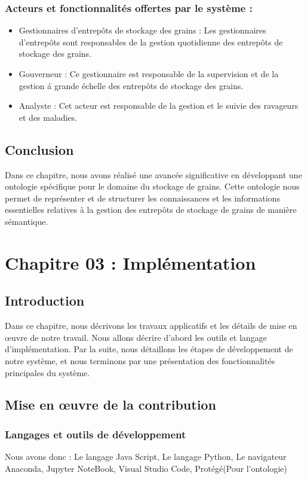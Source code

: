 \documentclass{article}
\begin{document}
	\subsubsection{Acteurs et fonctionnalités offertes par le système :}
	\begin{itemize}
		\item Gestionnaires d'entrepôts de stockage des grains : Les gestionnaires d'entrepôts sont responsables de la gestion quotidienne des entrepôts de
		stockage des grains.
		\item Gouverneur : Ce gestionnaire est responsable de la supervision et de la gestion á grande échelle des
		entrepôts de stockage des grains.
		\item Analyste : Cet acteur est responsable de la gestion et le suivie des ravageurs et des maladies.
	\end{itemize}
	
	\subsection{Conclusion}
	Dans ce chapitre, nous avons réalisé une avancée significative en développant une
	ontologie spécifique pour le domaine du stockage de grains. Cette ontologie nous permet de
	représenter et de structurer les connaissances et les informations essentielles relatives à la
	gestion des entrepôts de stockage de grains de manière sémantique.
	
	\section{Chapitre 03 : Implémentation}
	
	\subsection{Introduction}
	Dans ce chapitre, nous décrivons les travaux applicatifs et les détails de mise en œuvre de
	notre travail. Nous allons décrire d'abord les outils et langage d'implémentation. Par la suite,
	nous détaillons les étapes de développement de notre système, et nous terminons par une
	présentation des fonctionnalités principales du système.
	
	\subsection{Mise en œuvre de la contribution}
	\subsubsection{Langages et outils de développement}
	Nous avons donc : Le langage Java Script, Le langage Python, Le navigateur Anaconda, Jupyter NoteBook, Visual Studio Code, Protégé(Pour l'ontologie)
\end{document}

